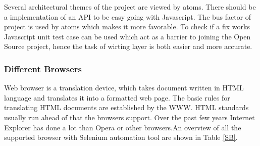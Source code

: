 \documentclass[article,type=msc,colorback,accentcolor=tud9c,twoside,11pt]{tudthesis}
\begin{document}
Several architectural themes of the project are viewed by atoms. There should be a implementation of an API to be easy going with Javascript. The bus factor of project is used by atoms which makes it more favorable. To check if a fix works Javascript unit test case can be used which act as a barrier to joining the Open Source project, hence the task of wirting layer is both easier and more accurate.

\subsubsection{Different Browsers}
Web browser is a translation device, which takes document written in HTML language and translates it into a formatted web page. The basic rules for translating HTML documents are established by the WWW. HTML standards usually run ahead of that the browsers support. Over the past few years Internet Explorer has done a lot than Opera or other browsers.An overview of all the supported browser with Selenium automation tool are shown in Table \ref{SB}.
\end{document}
